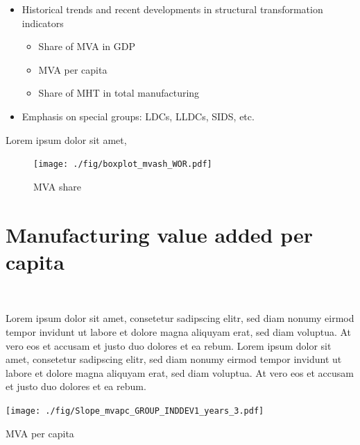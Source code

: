\documentclass[
  openany, nofonts]{tufte-book}
\providecommand{\tightlist}{%
  \setlength{\itemsep}{0pt}\setlength{\parskip}{0pt}}
\begin{document}
\begin{itemize}
\tightlist
\item
  Historical trends and recent developments in structural transformation indicators

  \begin{itemize}
  \tightlist
  \item
    Share of MVA in GDP
  \item
    MVA per capita
  \item
    Share of MHT in total manufacturing
  \end{itemize}
\item
  Emphasis on special groups: LDCs, LLDCs, SIDS, etc.
\end{itemize}

\vspace*{\fill}

Lorem ipsum dolor sit amet,

\begin{figure}
\texttt{[image: ./fig/boxplot\_mvash\_WOR.pdf]} \caption[MVA share]{MVA share}\label{fig:c06-mvash-boxplot-world}
\end{figure}

\pagebreak

\clearpage\pagebreak

\hypertarget{manufacturing-value-added-per-capita-1}{%
\section{Manufacturing value added per capita}\label{manufacturing-value-added-per-capita-1}}

~

Lorem ipsum dolor sit amet, consetetur sadipscing elitr, sed diam nonumy eirmod tempor invidunt ut labore et dolore magna aliquyam erat, sed diam voluptua. At vero eos et accusam et justo duo dolores et ea rebum. Lorem ipsum dolor sit amet, consetetur sadipscing elitr, sed diam nonumy eirmod tempor invidunt ut labore et dolore magna aliquyam erat, sed diam voluptua. At vero eos et accusam et justo duo dolores et ea rebum.

\begin{marginfigure}
\texttt{[image: ./fig/Slope\_mvapc\_GROUP\_INDDEV1\_years\_3.pdf]} \caption[MVA per capita]{MVA per capita}\label{fig:c06-mvapc-inddev3}
\end{marginfigure}
\end{document}

